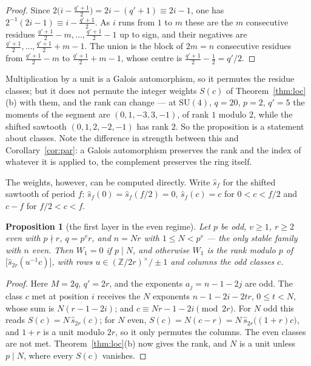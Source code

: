 \documentclass[11pt,a4paper]{article}
\newtheorem{proposition}[theorem]{Proposition}
\theoremstyle{definition}
\newcommand{\SU}{\mathrm{SU}}
\newcommand{\ZZ}{\mathbb{Z}}
\begin{document}
\begin{proof}
Since $2\bigl(i-\tfrac{q'+1}{2}\bigr)=2i-(q'+1)\equiv2i-1$, one has
$2^{-1}(2i-1)\equiv i-\tfrac{q'+1}{2}$. As $i$ runs from $1$ to $m$ these are the $m$ consecutive
residues $\tfrac{q'+1}{2}-m,\dots,\tfrac{q'+1}{2}-1$ up to sign, and their negatives are
$\tfrac{q'+1}{2},\dots,\tfrac{q'+1}{2}+m-1$. The union is the block of $2m=n$ consecutive residues
from $\tfrac{q'+1}{2}-m$ to $\tfrac{q'+1}{2}+m-1$, whose centre is $\tfrac{q'+1}{2}-\tfrac12=q'/2$.
\end{proof}

Multiplication by a unit is a Galois automorphism, so it permutes the residue classes; but it
does not permute the integer weights $S(c)$ of Theorem~\ref{thm:loc}(b) with them, and the rank
can change --- at $\SU(4)$, $q=20$, $p=2$, $q'=5$ the moments of the segment are
$(0,1,-3,3,-1)$, of rank $1$ modulo $2$, while the shifted sawtooth $(0,1,2,-2,-1)$ has rank $2$.
So the proposition is a statement about classes. Note the difference in strength between this and
Corollary~\ref{cor:par}: a Galois automorphism preserves the rank and the index of whatever it is
applied to, the complement preserves the ring itself.

The weights, however, can be computed directly. Write $\widehat s_f$ for the shifted sawtooth of
period $f$: $\widehat s_f(0)=\widehat s_f(f/2)=0$, $\widehat s_f(c)=c$ for $0<c<f/2$ and $c-f$ for
$f/2<c<f$.

\begin{proposition}[the first layer in the even regime]\label{prop:parimp}
Let $p$ be odd, $v\ge1$, $r\ge2$ even with $p\nmid r$, $q=p^vr$, and $n=Nr$ with $1\le N<p^v$ --- the
only stable family with $n$ even. Then $W_1=0$ if $p\mid N$, and otherwise $W_1$ is the rank modulo
$p$ of $\bigl[\widehat s_{2r}(u^{-1}c)\bigr]$, with rows $u\in(\ZZ/2r)^\times/\pm1$ and columns the
\emph{odd} classes $c$.
\end{proposition}

\begin{proof}
Here $M=2q$, $q'=2r$, and the exponents $a_j=n-1-2j$ are odd. The class $c$ met at position $i$
receives the $N$ exponents $n-1-2i-2tr$, $0\le t<N$, whose sum is $N(r-1-2i)$; and
$c\equiv Nr-1-2i\pmod{2r}$. For $N$ odd this reads $S(c)=N\,\widehat s_{2r}(c)$; for $N$ even,
$S(c)=N(c-r)=N\,\widehat s_{2r}\bigl((1+r)c\bigr)$, and $1+r$ is a unit modulo $2r$, so it only permutes
the columns. The even classes are not met. Theorem~\ref{thm:loc}(b) now gives the rank, and $N$ is a
unit unless $p\mid N$, where every $S(c)$ vanishes.
\end{proof}
\end{document}
